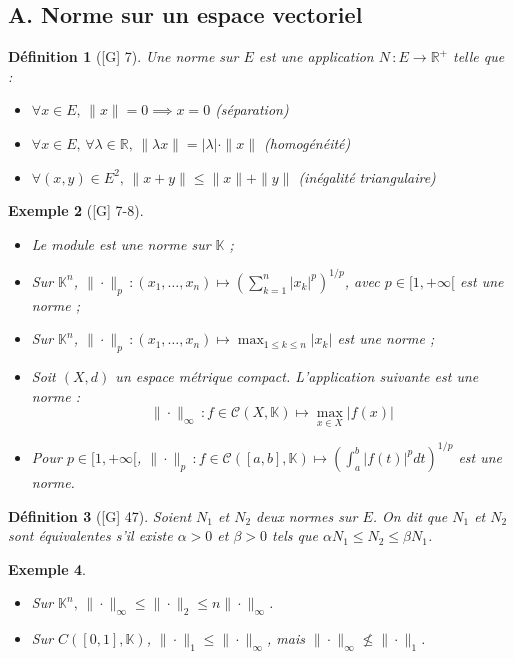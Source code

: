 \documentclass[10pt, a4paper, parskip=full, twoside, twocolumn]{report}
\newtheorem{definition}{Définition}
\newtheorem{example}[definition]{Exemple}
\newcommand{\IK}{\mathbb{K}}
\newcommand{\IR}{\mathbb{R}}
\begin{document}
\subsection*{A. Norme sur un espace vectoriel}

\begin{definition}[\textnormal{[G] 7}]
	Une \emph{norme sur $E$} est une application $N\,\colon E\to\IR^+$ telle que :
	\begin{itemize}
		\item $\forall x\in E,\, \|x\|=0\implies x=0$ (séparation)
		\item $\forall x\in E,\,\forall\lambda\in\IR,\,\|\lambda x\|=\vert\lambda\vert\cdot\|x\|$ (homogénéité)
		\item $\forall (x,y)\in E^2,\, \|x+y\|\leq \|x\|+\|y\|$ (inégalité triangulaire)
	\end{itemize}
\end{definition}

\begin{example}[\textnormal{[G] 7-8}]
	\begin{itemize}
		\item Le module est une norme sur $\IK$ ;
		\item Sur $\IK^n$, $\|\cdot\|_p\,\colon (x_1,\dots, x_n)\mapsto \left(\sum_{k=1}^{n} \vert x_k\vert^p\right)^{1/p}$, avec $p\in [1,+\infty[$ est une norme ;
		\item Sur $\IK^n$, $\|\cdot\|_p\,\colon (x_1,\dots, x_n)\mapsto \max_{1\leq k\leq n} \vert x_k\vert$ est une norme ;
		\item Soit $(X,d)$ un espace métrique compact. L'application suivante est une norme : $$\|\cdot\|_{\infty}\,\colon f\in\mathcal{C}(X,\IK)\mapsto \max_{x\in X}\vert f(x)\vert$$
		\item Pour $p\in [1,+\infty[$, $\|\cdot\|_p\,\colon f\in\mathcal{C}([a,b],\IK)\mapsto \left(\int_{a}^{b}\vert f(t)\vert^p dt\right)^{1/p}$ est une norme.
	\end{itemize}
\end{example}

\begin{definition}[\textnormal{[G] 47}]
	Soient $N_1$ et $N_2$ deux normes sur $E$. On dit que $N_1$ et $N_2$ sont \emph{équivalentes} s'il existe $\alpha > 0$ et $\beta > 0$ tels que $\alpha N_1\leq N_2\leq \beta N_1$.
\end{definition}

\begin{example}
	\begin{itemize}
		\item Sur $\IK^n,\,\|\cdot\|_{\infty}\leq \|\cdot\|_2\leq n\|\cdot\|_{\infty}$.
		\item Sur $C([0,1], \IK)$, $\|\cdot\|_1 \leq \|\cdot\|_{\infty}$, mais $\|\cdot\|_{\infty}\not \leq  \|\cdot\|_1$.
	\end{itemize}
\end{example}
\end{document}
